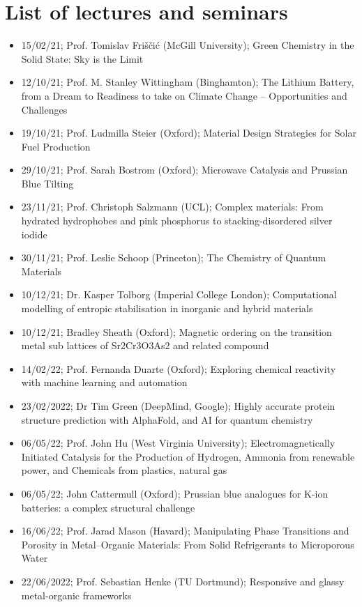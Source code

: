 \documentclass[12pt,a4paper,twoside,nobind]{ociamthesis}
\begin{document}
\section*{List of lectures and seminars}

\begin{itemize}
  \item 15/02/21; Prof. Tomislav Friščić (McGill University); Green Chemistry in the Solid State: Sky is the Limit
  \item 12/10/21;	Prof. M. Stanley Wittingham (Binghamton);	The Lithium Battery, from a Dream to Readiness to take on Climate Change – Opportunities and Challenges
  \item 19/10/21;	Prof. Ludmilla Steier (Oxford);	Material Design Strategies for Solar Fuel Production
  \item 29/10/21;	Prof. Sarah Bostrom (Oxford);	Microwave Catalysis and Prussian Blue Tilting
  \item 23/11/21;	Prof. Christoph Salzmann (UCL);	Complex materials: From hydrated hydrophobes and pink phosphorus to stacking-disordered silver iodide
  \item 30/11/21;	Prof. Leslie Schoop (Princeton);	The Chemistry of Quantum Materials
  \item 10/12/21; Dr. Kasper Tolborg (Imperial College London); Computational modelling of entropic stabilisation in inorganic and hybrid materials
  \item 10/12/21; Bradley Sheath (Oxford); Magnetic ordering on the transition metal sub lattices of Sr2Cr3O3As2 and related compound
  \item 14/02/22;	Prof. Fernanda Duarte (Oxford);	Exploring chemical reactivity with machine learning and automation
  \item 23/02/2022; Dr Tim Green (DeepMind, Google); Highly accurate protein structure prediction with AlphaFold, and AI for quantum chemistry
  \item 06/05/22; Prof. John Hu (West Virginia University); Electromagnetically Initiated Catalysis for the Production of Hydrogen, Ammonia from renewable power, and Chemicals from plastics, natural gas
  \item 06/05/22; John Cattermull (Oxford); Prussian blue analogues for K-ion batteries: a complex structural challenge
  \item 16/06/22; Prof. Jarad Mason (Havard); Manipulating Phase Transitions and Porosity in Metal–Organic Materials: From Solid Refrigerants to Microporous Water
  \item 22/06/2022; Prof. Sebastian Henke (TU Dortmund); Responsive and glassy metal-organic frameworks
\end{itemize}
\end{document}
